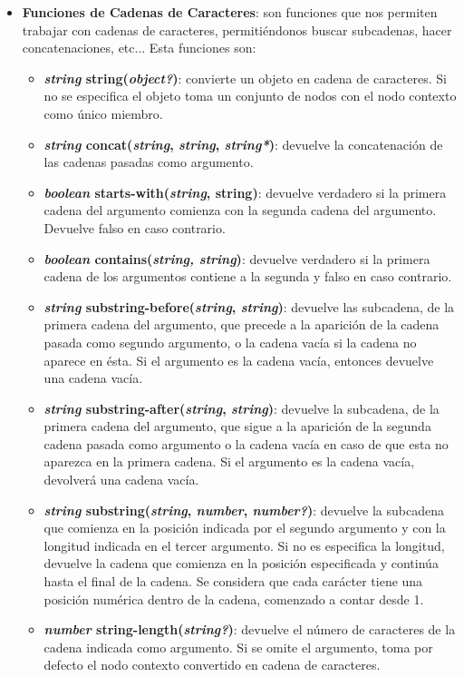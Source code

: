 \begin{itemize}
    \item \textbf{Funciones de Cadenas de Caracteres}: son funciones que nos permiten trabajar con cadenas de caracteres, permitiéndonos buscar subcadenas, hacer concatenaciones, etc... Esta funciones son:
    \begin{itemize}
        \item \textbf{\textit{string} string(\textit{object?})}: convierte un objeto en cadena de caracteres. Si no se especifica el objeto toma un conjunto de nodos con el nodo contexto como único miembro.
        \item \textbf{\textit{string} concat(\textit{string}, \textit{string}, \textit{string*})}: devuelve la concatenación de las cadenas pasadas como argumento.
        \item \textbf{\textit{boolean} starts-with(\textit{string}, string)}: devuelve verdadero si la primera cadena del argumento comienza con la segunda cadena del argumento. Devuelve falso en caso contrario.
        \item \textbf{\textit{boolean} contains(\textit{string, string})}: devuelve verdadero si la primera cadena de los argumentos contiene a la segunda y falso en caso contrario.
        \item \textbf{\textit{string} substring-before(\textit{string}, \textit{string})}: devuelve las subcadena, de la primera cadena del argumento, que precede a la aparición de la cadena pasada como segundo argumento, o la cadena vacía si la cadena no aparece en ésta. Si el argumento es la cadena vacía, entonces devuelve una cadena vacía.
        \item \textbf{\textit{string} substring-after(\textit{string}, \textit{string})}: devuelve la subcadena, de la primera cadena del argumento, que sigue a la aparición de la segunda cadena pasada como argumento o la cadena vacía en caso de que esta no aparezca en la primera cadena. Si el argumento es la cadena vacía, devolverá una cadena vacía.
        \item \textbf{\textit{string} substring(\textit{string}, \textit{number}, \textit{number?})}: devuelve la subcadena que comienza en la posición indicada por el segundo argumento y con la longitud indicada en el tercer argumento. Si no es especifica la longitud, devuelve la cadena que comienza en la posición especificada y continúa hasta el final de la cadena. Se considera que cada carácter tiene una posición numérica dentro de la cadena, comenzado a contar desde 1.
        \item \textbf{\textit{number} string-length(\textit{string?})}: devuelve el número de caracteres de la cadena indicada como argumento. Si se omite el argumento, toma por defecto el nodo contexto convertido en cadena de caracteres.

\end{itemize}
\end{itemize}

